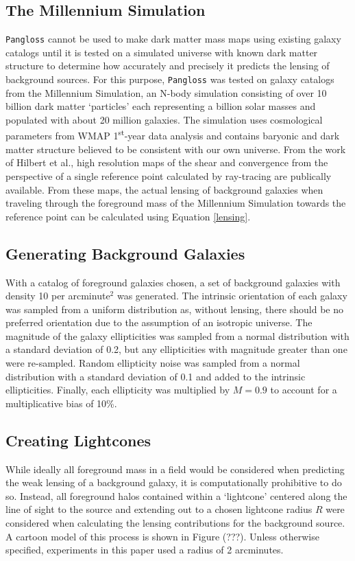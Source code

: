 \documentclass[%
 reprint,
 amsmath,amssymb,
 aps,
]{revtex4-1}
\begin{document}
\subsection*{The Millennium Simulation}
\texttt{Pangloss} cannot be used to make dark matter mass maps using existing galaxy catalogs until it is tested on a simulated universe with known dark matter structure to determine how accurately and precisely it predicts the lensing of background sources. For this purpose, \texttt{Pangloss} was tested on galaxy catalogs from the Millennium Simulation, an N-body simulation consisting of over 10 billion dark matter `particles' each representing a billion solar masses and populated with about 20 million galaxies\cite{millennium_simulation}. The simulation uses cosmological parameters from WMAP 1\textsuperscript{st}-year data analysis and contains baryonic and dark matter structure believed to be consistent with our own universe. From the work of Hilbert et al.\cite{ray_tracing}, high resolution maps of the shear and convergence from the perspective of a single reference point calculated by ray-tracing are publically available. From these maps, the actual lensing of background galaxies when traveling through the foreground mass of the Millennium Simulation towards the reference point can be calculated using Equation \eqref{lensing}.

\subsection*{Generating Background Galaxies}
With a catalog of foreground galaxies chosen, a set of background galaxies with density 10 per arcminute$^2$ was generated. The intrinsic orientation of each galaxy was sampled from a uniform distribution as, without lensing, there should be no preferred orientation due to the assumption of an isotropic universe. The magnitude of the galaxy ellipticities was sampled from a normal distribution with a standard deviation of 0.2, but any ellipticities with magnitude greater than one were re-sampled. Random ellipticity noise was sampled from a normal distribution with a standard deviation of 0.1 and added to the intrinsic ellipticities. Finally, each ellipticity was multiplied by $M=0.9$ to account for a multiplicative bias of 10\%.

\subsection*{Creating Lightcones}
While ideally all foreground mass in a field would be considered when predicting the weak lensing of a background galaxy, it is computationally prohibitive to do so. Instead, all foreground halos contained within a `lightcone' centered along the line of sight to the source and extending out to a chosen lightcone radius $R$ were considered when calculating the lensing contributions for the background source. A cartoon model of this process is shown in Figure (???). Unless otherwise specified, experiments in this paper used a radius of 2 arcminutes.
\end{document}

